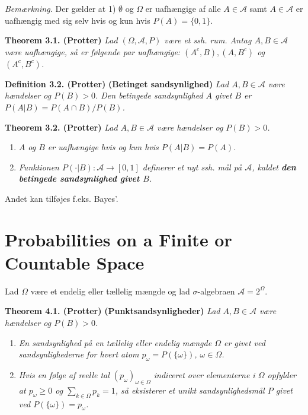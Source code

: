 \documentclass[a4paper,10pt,openany]{book}
\providecommand{\tightlist}{%
 \setlength{\itemsep}{0pt}\setlength{\parskip}{0pt}}
\begin{document}
\emph{Bemærkning.} Der gælder at 1) \(\emptyset\) og \(\Omega\) er uafhængige af alle \(A\in\mathcal{A}\) samt \(A\in\mathcal{A}\) er uafhængig med sig selv hvis og kun hvis \(P(A)=\{0,1\}\).

\textbf{Theorem 3.1. (Protter)} \emph{Lad \((\Omega,\mathcal{A},P)\) være et ssh. rum. Antag \(A,B\in\mathcal{A}\) være uafhængige, så er følgende par uafhængige: \((A^c,B),(A,B^c)\) og \((A^c,B^c)\).}

\textbf{Definition 3.2. (Protter)} \textbf{(Betinget sandsynlighed)} \emph{Lad \(A,B\in\mathcal{A}\) være hændelser og \(P(B)>0\). Den betingede sandsynlighed \(A\) givet \(B\) er \(P(A\vert B)=P(A\cap B)/P(B)\).}

\textbf{Theorem 3.2. (Protter)} \emph{Lad \(A,B\in\mathcal{A}\) være hændelser og \(P(B)>0\).}

\begin{enumerate}
\def\labelenumi{\alph{enumi}.}
\tightlist
\item
  \emph{\(A\) og \(B\) er uafhængige hvis og kun hvis \(P(A\vert B)=P(A)\).}
\item
  \emph{Funktionen \(P(\cdot \vert B) : \mathcal{A} \to [0,1]\) definerer et nyt ssh. mål på \(\mathcal{A}\), kaldet \textbf{den betingede sandsynlighed givet \(B\)}.}
\end{enumerate}

Andet kan tilføjes f.eks. Bayes'.

\hypertarget{probabilities-on-a-finite-or-countable-space}{%
\section{Probabilities on a Finite or Countable Space}\label{probabilities-on-a-finite-or-countable-space}}

Lad \(\Omega\) være et endelig eller tællelig mængde og lad \(\sigma\)-algebraen \(\mathcal{A}=2^\Omega\).

\textbf{Theorem 4.1. (Protter)} \textbf{(Punktsandsynligheder)} \emph{Lad \(A,B\in\mathcal{A}\) være hændelser og \(P(B)>0\).}

\begin{enumerate}
\def\labelenumi{\alph{enumi}.}
\tightlist
\item
  \emph{En sandsynlighed på en tællelig eller endelig mængde \(\Omega\) er givet ved sandsynlighederne for hvert atom \(p_\omega=P(\{\omega\})\), \(\omega\in\Omega\).}
\item
  \emph{Hvis en følge af reelle tal \((p_\omega)_{\omega\in\Omega}\) indiceret over elementerne i \(\Omega\) opfylder at \(p_\omega\ge0\) og \(\sum_{k\in\Omega}p_k=1\), så eksisterer et unikt sandsynlighedsmål \(P\) givet ved \(P(\{\omega\})=p_\omega\).}
\end{enumerate}
\end{document}
